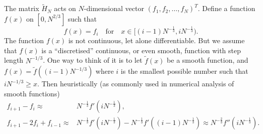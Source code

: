 \documentclass[11pt, a4paper]{article}
\numberwithin{equation}{section}
\theoremstyle{definition}
\theoremstyle{remark}
\begin{document}
The matrix $\tilde{H}_N$ acts on $N$-dimensional vector $(f_1, f_2, \dotsc, f_N)^T$. Define a function $f(x)$ on $[0, N^{2/3}]$ such that
\begin{equation} \label{eq:equiv_vector_step_func}
  f(x) = f_i \quad \text{for} \quad x \in [(i - 1)N^{-\frac{1}{3}}, iN^{-\frac{1}{3}}).
\end{equation}
The function $f(x)$ is not continuous, let alone differentiable. But we assume that $f(x)$ is a ``discretised'' continuous, or even smooth, function with step length $N^{-1/3}$. One way to think of it is to let $\tilde{f}(x)$ be a smooth function, and $f(x) = \tilde{f}((i - 1)N^{-1/3})$ where $i$ is the smallest possible number such that $i N^{-1/3} \geq x$. Then heuristically (as commonly used in numerical analysis of smooth functions)
\begin{align}
  f_{i + 1} - f_i \approx {}& N^{-\frac{1}{3}} f'(i N^{-\frac{1}{3}}), \\
  f_{i + 1} - 2f_i + f_{i - 1} \approx {}& N^{-\frac{1}{3}} f'(i N^{-\frac{1}{3}}) - N^{-\frac{1}{3}} f'((i - 1) N^{-\frac{1}{3}}) \approx N^{-\frac{2}{3}} f''(i N^{-\frac{1}{3}}).
\end{align}
\end{document}
